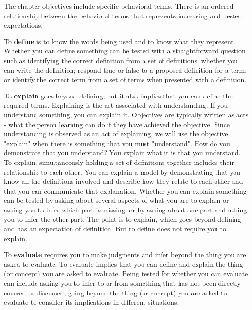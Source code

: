 The chapter objectives include specific behavioral terms. There is an ordered relationship between the behavioral terms that represents increasing and nested expectations. 

To \textbf{define} is to know the words being used and to know what they represent. Whether you can define something can be tested with a straightforward question such as identifying the correct definition from a set of definitions; whether you can write the definition; respond true or false to a proposed definition for a term; or identify the correct term from a set of terms when presented with a definition. 

To \textbf{explain} goes beyond defining, but it also implies that you can define the required terms. Explaining is the act associated with understanding. If you understand something, you can explain it. Objectives are typically written as acts - what the person learning can do if they have achieved the objective. Since understanding is observed as an act of explaining, we will use the objective "explain" when there is something that you must "understand". How do you demonstrate that you understand? You explain what it is that you understand. To explain, simultaneously holding a set of definitions together includes their relationship to each other. You can explain a model by demonstrating that you know all the definitions involved and describe how they relate to each other and that you can communicate that explanation. Whether you can explain something can be tested by asking about several aspects of what you are to explain or asking you to infer which part is missing; or by asking about one part and asking you to infer the other part. The point is to explain, which goes beyond defining and has an expectation of definition. But to define does not require you to explain. 

To \textbf{evaluate} requires you to make judgments and infer beyond the thing you are asked to evaluate. To evaluate implies that you can define and explain the thing (or concept) you are asked to evaluate. Being tested for whether you can evaluate can include asking you to infer to or from something that has not been directly covered or discussed, going beyond the thing (or concept) you are asked to evaluate to consider its implications in different situations. 

